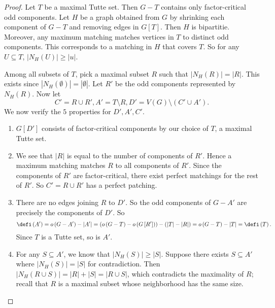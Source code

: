 \documentclass[co342]{subfiles}
\begin{document}
    \begin{proof}
        Let $T$ be a maximal Tutte set. Then $G-T$ contains only factor-critical odd components. Let $H$ be a graph obtained from $G$ by shrinking each component of $G-T$ and removing edges in $G\left[ T \right]$. Then $H$ is bipartitie. Moreover, any maximum matching matches vertices in $T$ to distinct odd components. This corresponds to a matching in $H$ that covers $T$. So for any $U\subseteq T$, $\left| N_H\left( U \right) \right|\geq \left| u \right|$.

        Among all subsets of $T$, pick a maximal subset $R$ such that $\left| N_H\left( R \right) \right|=\left| R \right|$. This exists since $\left| N_H\left( \emptyset \right) \right|=\left| \emptyset \right|$. Let $R'$ be the odd components represented by $N_H\left( R \right)$. Now let
        \begin{equation*}
            C' = R\cup R', A'=T\setminus R, D'=V\left( G \right)\setminus \left( C'\cup A' \right).
        \end{equation*}
        We now verify the $5$ properties for $D',A',C'$.
        \begin{enumerate}
            \item $G\left[ D' \right]$ consists of factor-critical components by our choice of $T$, a maximal Tutte set.
            \item We see that $\left| R \right|$ is equal to the number of components of $R'$. Hence a maximum matching matches $R$ to all components of $R'$. Since the components of $R'$ are factor-critical, there exist perfect matchings for the rest of $R'$. So $C'=R\cup R'$ has a perfect patching.
            \item There are no edges joining $R$ to $D'$. So the odd components of $G-A'$ are precisely the components of $D'$. So
                \begin{equation*}
                    \defi\left( A' \right) = o\left( G-A' \right)-\left| A' \right| = \left(o\left( G-T \right)-o\left( G\left[ R' \right] \right)\right)-\left( \left| T \right|-\left| R \right| \right) = o\left( G-T \right)-\left| T \right|=\defi\left( T \right).
                \end{equation*}
                Since $T$ is a Tutte set, so is $A'$.
            \item For any $S\subseteq A'$, we know that $\left| N_H\left( S \right) \right|\geq\left| S \right|$. Suppose there exists $S\subseteq A'$ where $\left| N_H\left( S \right) \right|=\left| S \right|$ for contradiction. Then $\left| N_H\left( R\cup S \right) \right|=\left| R \right|+\left| S \right|=\left| R\cup S \right|$, which contradicts the maximality of $R$; recall that $R$ is a maximal subset whose neighborhood has the same size.


\end{enumerate}
\end{proof}
\end{document}
